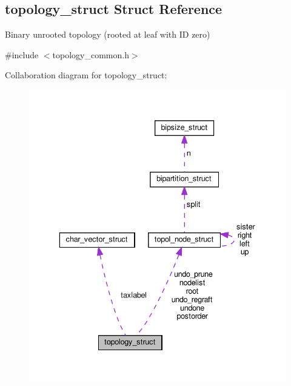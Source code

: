\hypertarget{structtopology__struct}{}\subsection{topology\+\_\+struct Struct Reference}
\label{structtopology__struct}


Binary unrooted topology (rooted at leaf with ID zero)  




{\ttfamily \#include $<$topology\+\_\+common.\+h$>$}



Collaboration diagram for topology\+\_\+struct\+:\nopagebreak
\begin{figure}[H]
\begin{center}
\leavevmode
\includegraphics[width=336pt]{structtopology__struct__coll__graph}
\end{center}
\end{figure}
